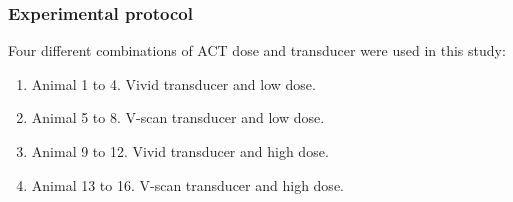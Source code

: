 \subsubsection{Experimental protocol}
\label{sec protocols}
Four different combinations of ACT\texttrademark{} dose and transducer were used in this study:

\begin{enumerate}
  \item Animal 1 to 4. Vivid transducer and low dose.
  \item Animal 5 to 8. V-scan transducer and low dose.
  \item Animal 9 to 12. Vivid transducer and high dose.
  \item Animal 13 to 16. V-scan transducer and high dose.
\end{enumerate}
 
